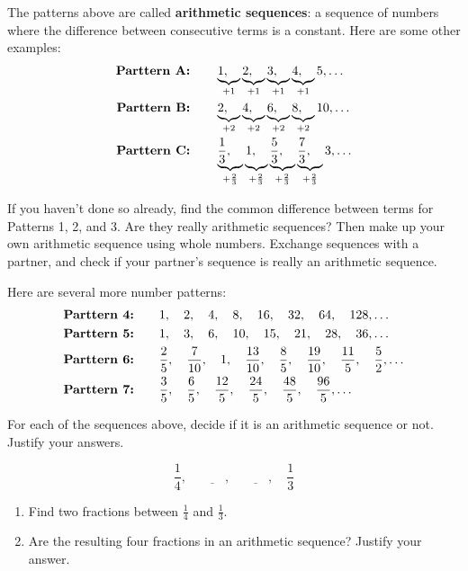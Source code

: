 The patterns above are called {\bf arithmetic sequences}: a sequence of numbers where the difference between consecutive terms is a constant.  Here are some other examples:
\begin{align*}
\text{\bf Parttern A:} &\qquad\underbrace{1, \quad }_{+1}\underbrace{2, \quad }_{+1}\underbrace{3, \quad }_{+1}\underbrace{4, \quad }_{+1}5, \ldots\\
\text{\bf Parttern B:} &\qquad\underbrace{2, \quad }_{+2}\underbrace{4, \quad }_{+2}\underbrace{6, \quad }_{+2}\underbrace{8, \quad }_{+2}10, \ldots\\
\text{\bf Parttern C:} &\qquad\underbrace{\frac 1 3, \quad}_{+\frac 2 3} \underbrace{ 1 , \phantom{\frac 12}}_{+\frac 2 3}\underbrace{ \frac 5 3, \quad}_{+\frac 2 3}\underbrace{\frac 7 3, \quad}_{+\frac 2 3}  3, \ldots
\end{align*}


\begin{thinkpair*}
If you haven't done so already, find the common difference between terms for Patterns 1, 2, and 3.  Are they really arithmetic sequences?  Then
make up your own arithmetic sequence using whole numbers.  Exchange sequences with a partner, and check if your partner's sequence is really an arithmetic sequence.
\end{thinkpair*}

Here are several more number patterns:
\begin{align*}
\text{\bf Parttern 4:} &\qquad 1, \quad  2 , \quad 4, \quad  8, \quad 16, \quad 32, \quad 64, \quad 128, \ldots\\
\text{\bf Parttern 5:} & \qquad 1, \quad  3 , \quad 6, \quad  10, \quad 15, \quad 21, \quad 28, \quad 36, \ldots\\
\text{\bf Parttern 6:} &\qquad \frac 2 5, \quad \frac 7{10} , \quad 1, \quad \frac {13}{10}, \quad \frac 8 5, \quad \frac {19}{10}, \quad \frac {11}5, \quad \frac 5 2, \ldots\\
\text{\bf Parttern 7:} &\qquad\frac 3 5, \quad \frac 6 5 , \quad \frac {12} 5, \quad \frac {24}{5}, \quad \frac {48} 5, \quad \frac {96}{5}, \ldots
\end{align*}


\begin{thinkpair*}
For each of the sequences above, decide if it is an arithmetic sequence or not.  Justify your answers.
\end{thinkpair*}



\begin{problem}

\[
\frac 1 4, \quad \underline{\qquad}, \quad  \underline{\qquad}, \quad \frac 1 3
\]


\begin{enumerate}
\item
Find two fractions between $\frac 1 4$ and $\frac 1 3$.


\item
Are the resulting four fractions in an arithmetic sequence?  
Justify your answer.
\end{enumerate}


\end{problem}


